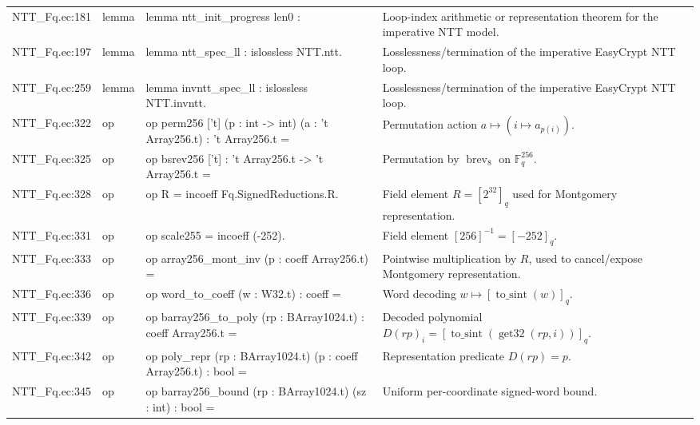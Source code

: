 \documentclass[10pt]{article}
\begin{document}
\begin{longtable}{L{0.11\textwidth}L{0.05\textwidth}L{0.38\textwidth}L{0.42\textwidth}}
NTT\_Fq.\allowbreak{}ec:\allowbreak{}181 & lemma & {\ttfamily\scriptsize lemma ntt\_init\_progress len0 :} & Loop-index arithmetic or representation theorem for the imperative NTT model. \\
NTT\_Fq.\allowbreak{}ec:\allowbreak{}197 & lemma & {\ttfamily\scriptsize lemma ntt\_spec\_ll : islossless NTT.ntt.} & Losslessness/termination of the imperative EasyCrypt NTT loop. \\
NTT\_Fq.\allowbreak{}ec:\allowbreak{}259 & lemma & {\ttfamily\scriptsize lemma invntt\_spec\_ll : islossless NTT.invntt.} & Losslessness/termination of the imperative EasyCrypt NTT loop. \\
NTT\_Fq.\allowbreak{}ec:\allowbreak{}322 & op & {\ttfamily\scriptsize op perm256 ['t] (p : int -> int) (a : 't Array256.t) : 't Array256.t =} & Permutation action $a\mapsto(i\mapsto a_{p(i)})$. \\
NTT\_Fq.\allowbreak{}ec:\allowbreak{}325 & op & {\ttfamily\scriptsize op bsrev256 ['t] : 't Array256.t -> 't Array256.t =} & Permutation by $\operatorname{brev}_8$ on $\mathbb F_q^{256}$. \\
NTT\_Fq.\allowbreak{}ec:\allowbreak{}328 & op & {\ttfamily\scriptsize op R = incoeff Fq.SignedReductions.R.} & Field element $R=[2^{32}]_q$ used for Montgomery representation. \\
NTT\_Fq.\allowbreak{}ec:\allowbreak{}331 & op & {\ttfamily\scriptsize op scale255 = incoeff (-252).} & Field element $[256]^{-1}=[-252]_q$. \\
NTT\_Fq.\allowbreak{}ec:\allowbreak{}333 & op & {\ttfamily\scriptsize op array256\_mont\_inv (p : coeff Array256.t) =} & Pointwise multiplication by $R$, used to cancel/expose Montgomery representation. \\
NTT\_Fq.\allowbreak{}ec:\allowbreak{}336 & op & {\ttfamily\scriptsize op word\_to\_coeff (w : W32.t) : coeff =} & Word decoding $w\mapsto[\operatorname{to\_sint}(w)]_q$. \\
NTT\_Fq.\allowbreak{}ec:\allowbreak{}339 & op & {\ttfamily\scriptsize op barray256\_to\_poly (rp : BArray1024.t) : coeff Array256.t =} & Decoded polynomial $D(rp)_i=[\operatorname{to\_sint}(\operatorname{get32}(rp,i))]_q$. \\
NTT\_Fq.\allowbreak{}ec:\allowbreak{}342 & op & {\ttfamily\scriptsize op poly\_repr (rp : BArray1024.t) (p : coeff Array256.t) : bool =} & Representation predicate $D(rp)=p$. \\
NTT\_Fq.\allowbreak{}ec:\allowbreak{}345 & op & {\ttfamily\scriptsize op barray256\_bound (rp : BArray1024.t) (sz : int) : bool =} & Uniform per-coordinate signed-word bound. \\

\end{longtable}
\end{document}
